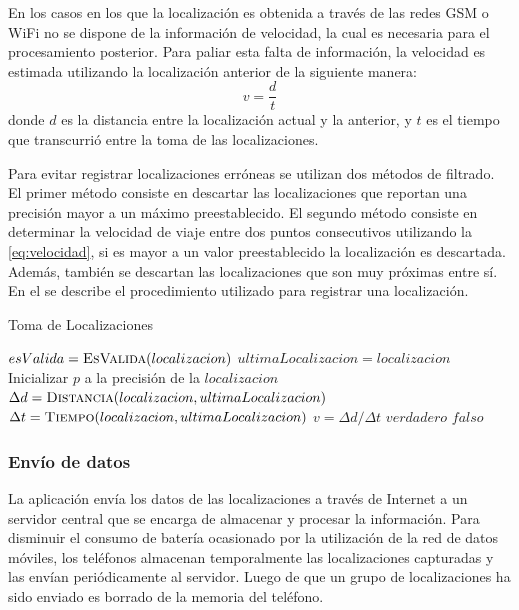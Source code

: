 En los casos en los que la localización es obtenida a través de las redes GSM o WiFi no se dispone de la información de velocidad, la cual es necesaria para el procesamiento posterior. Para paliar esta falta de información, la velocidad es estimada utilizando la localización anterior de la siguiente manera: \begin{equation} \label{eq:velocidad} v=\frac { d }{ t } \end{equation} donde $d$ es la distancia entre la localización actual y la anterior, y $t$ es el tiempo que transcurrió entre la toma de las localizaciones.

Para evitar registrar localizaciones erróneas se utilizan dos métodos de filtrado. El primer método consiste en descartar las localizaciones que reportan una precisión mayor a un máximo preestablecido. El segundo método consiste en determinar la velocidad de viaje entre dos puntos consecutivos utilizando la \cref{eq:velocidad}, si es mayor a un valor preestablecido la localización es descartada. Además, también se descartan las localizaciones que son muy próximas entre sí. En el  se describe el procedimiento utilizado para registrar una localización.

\begin{algorithm}
\caption{Toma de Localizaciones}
\label{alg:toma_de_localizaciones}
\begin{algorithmic}[1]
	\State $esValida = \Call{EsValida}{localizacion}$
		\State $ultimaLocalizacion = localizacion$
	\EndIf
\EndProcedure
\Statex
{}
	\State Inicializar $p$ a la precisión de la $localizacion$	
	\State $\Delta d = \Call{Distancia}{localizacion, ultimaLocalizacion}$
	\State $\Delta t = \Call{Tiempo}{localizacion, ultimaLocalizacion}$
	\State $v = \Delta d / \Delta t$
	    \State \Return $verdadero$
	\Else
	    \State \Return $falso$
	\EndIf
\EndFunction
\end{algorithmic}
\end{algorithm}

\subsubsection{Envío de datos}

La aplicación envía los datos de las localizaciones a través de Internet a un servidor central que se encarga de almacenar y procesar la información. Para disminuir el consumo de batería ocasionado por la utilización de la red de datos móviles, los teléfonos almacenan temporalmente las localizaciones capturadas y las envían periódicamente al servidor. Luego de que un grupo de localizaciones ha sido enviado es borrado de la memoria del teléfono.

